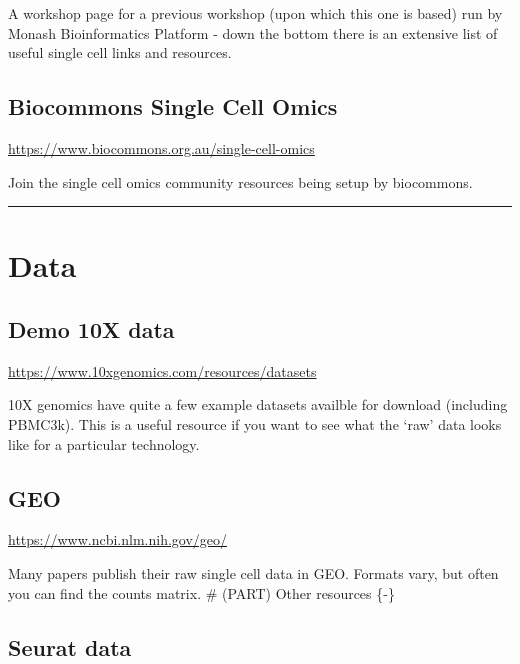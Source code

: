 \documentclass[
]{book}
\begin{document}
A workshop page for a previous workshop (upon which this one is based) run by Monash Bioinformatics Platform - down the bottom there
is an extensive list of useful single cell links and resources.

\subsection*{Biocommons Single Cell Omics}\label{biocommons-single-cell-omics}

\url{https://www.biocommons.org.au/single-cell-omics}

Join the single cell omics community resources being setup by biocommons.

\begin{center}\rule{0.5\linewidth}{0.5pt}\end{center}

\section{Data}\label{data}

\subsection*{Demo 10X data}\label{demo-10x-data}

\url{https://www.10xgenomics.com/resources/datasets}

10X genomics have quite a few example datasets availble for download (including PBMC3k).
This is a useful resource if you want to see what the `raw' data looks like for a particular technology.

\subsection*{GEO}\label{geo}

\url{https://www.ncbi.nlm.nih.gov/geo/}

Many papers publish their raw single cell data in GEO. Formats vary, but often you can find the counts matrix.
\# (PART) Other resources \{-\}

\subsection*{Seurat data}\label{seurat-data}
\end{document}
